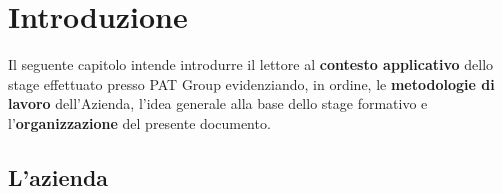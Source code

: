 
\chapter{Introduzione}
\label{cap:introduzione}

Il seguente capitolo intende introdurre il lettore al \textbf{contesto applicativo} dello stage effettuato presso PAT Group evidenziando, in ordine, le \textbf{metodologie di lavoro} dell'Azienda, l'idea generale alla base dello stage formativo e l'\textbf{organizzazione} del presente documento.




\section{L'azienda}


